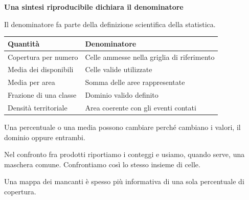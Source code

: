 \documentclass[12pt,aspectratio=1610]{beamer}
\newcommand{\PBody}[1]{\par{\fontsize{11.3}{14.8}\selectfont #1\par}}
\newcommand{\PSmall}[1]{\par{\fontsize{9.8}{13.1}\selectfont #1\par}}
\newcommand{\PInfo}[1]{%
\begin{tcolorbox}[enhanced,arc=1.6mm,boxrule=.55pt,colback=GeoTint,
 colframe=Rule!80!Classical,left=2.3mm,right=2.3mm,top=2mm,bottom=2mm,
 before skip=1mm,after skip=1mm]
\PSmall{#1}\end{tcolorbox}}
\begin{document}
\begin{frame}[plain]\hypertarget{slide31}{}
\begin{lrbox}{\TitleBox}
\begin{minipage}[t]{17.7cm}\raggedright\color{Ink}\fontsize{11.3}{14.8}\selectfont
\color{Navy}\bfseries\fontsize{20.6}{24.5}\selectfont Una sintesi riproducibile dichiara il denominatore
\end{minipage}\end{lrbox}

\begin{lrbox}{\RecallBox}
\begin{minipage}[t]{14.3cm}\raggedright\color{Ink}\fontsize{11.3}{14.8}\selectfont
\fontsize{10.3}{13.8}\selectfont Il denominatore fa parte della definizione scientifica della statistica.
\end{minipage}\end{lrbox}

\begin{lrbox}{\PilotLeftBox}
\begin{minipage}[t]{10.05cm}\raggedright\color{Ink}\fontsize{11.3}{14.8}\selectfont
{\fontsize{10.2}{13.1}\selectfont\renewcommand{\arraystretch}{1.45}\begin{tabular}{@{}p{4.2cm}p{4.8cm}@{}}\toprule
\textbf{Quantità} & \textbf{Denominatore}\\\midrule
Copertura per numero & Celle ammesse nella griglia di riferimento\\
Media dei disponibili & Celle valide utilizzate\\
Media per area & Somma delle aree rappresentate\\
Frazione di una classe & Dominio valido definito\\
Densità territoriale & Area coerente con gli eventi contati\\
\bottomrule\end{tabular}}

\end{minipage}\end{lrbox}

\begin{lrbox}{\PilotRightBox}
\begin{minipage}[t]{7.55cm}\raggedright\color{Ink}\fontsize{11.3}{14.8}\selectfont
\PBody{Una percentuale o una media possono cambiare perché cambiano i valori, il dominio oppure entrambi.}
\vspace{2.5mm}
\PInfo{Nel confronto fra prodotti riportiamo i conteggi e usiamo, quando serve, una maschera comune. Confrontiamo così lo stesso insieme di celle.}
\PBody{Una mappa dei mancanti è spesso più informativa di una sola percentuale di copertura.}
\vspace{2.5mm}


\end{minipage}
\end{lrbox}
\end{frame}
\end{document}
